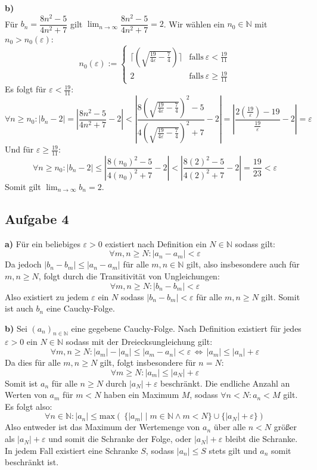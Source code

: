 \documentclass[a4paper,graphics,11pt]{article}
\newcommand{\aufgabe}[1]{\subsection*{Aufgabe #1}}
\begin{document}
\textbf{b)}\\
Für $b_n=\dfrac{8n^2-5}{4n^2+7}$ gilt $\lim_{n \to\infty}\limits \dfrac{8n^2-5}{4n^2+7}=2$.
Wir wählen ein $n_0 \in \mathbb{N}$ mit $n_0 > n_0(\varepsilon)$:
$$
    n_0(\varepsilon) := \begin{cases}
        \Big\lceil\left(\sqrt{\frac{19}{4\varepsilon} - \frac{7}{4}}\right)\Big\rceil
            & \text{falls}\ \varepsilon < \frac{19}{11}\\
        2
            & \text{falls}\ \varepsilon \geq \frac{19}{11}
    \end{cases}
$$
Es folgt für $\varepsilon < \frac{19}{11}\colon$
$$
    \forall n \geq n_0\colon \vert b_n -2\vert = \left|\frac{8n^2-5}{4n^2+7}-2\right| <
    \left|\frac{8\left(\sqrt{\frac{19}{4\varepsilon}-\frac{7}{4}} \right)^2-5}{4\left(\sqrt{\frac{19}{4\varepsilon} - \frac{7}{4}} \right)^2+7} -2\right|
    =\left|\frac{2(\frac{19}{\varepsilon})-19}{\frac{19}{\varepsilon}} -2\right| = \varepsilon
$$
Und für $\varepsilon \geq \frac{19}{11}\colon$
$$
    \forall n\geq n_0 \colon \vert b_n -2\vert \leq \left|\frac{8(n_0)^2-5}{4(n_0)^2+7}-2\right|
    < \left|\frac{8(2)^2-5}{4(2)^2+7}-2\right| = \frac{19}{23} < \varepsilon
$$
Somit gilt $\lim_{n \to \infty}\limits b_n = 2$.
\newpage
\aufgabe{4}
\textbf{a)}
Für ein beliebiges $\varepsilon > 0$ existiert nach Definition ein $N \in \mathbb{N}$ sodass
gilt:
$$
    \forall m,n \geq N\colon |a_n-a_m| < \varepsilon
$$
Da jedoch $|b_n - b_m| \leq |a_n-a_m|$ für alle $m,n \in \mathbb{N}$ gilt, also insbesondere
auch für $m,n \geq N$, folgt durch die Transitivität von Ungleichungen:
$$
    \forall m,n \geq N\colon |b_n-b_m| < \varepsilon
$$
Also existiert zu jedem $\varepsilon$ ein $N$ sodass $|b_n-b_m| < \varepsilon$ für alle
$m,n \geq N$ gilt. Somit ist auch $b_n$ eine Cauchy-Folge.


\textbf{b)}
Sei $(a_n)_{n \in \mathbb{N}}$ eine gegebene Cauchy-Folge. Nach Definition existiert
für jedes $\varepsilon >0$ ein $N \in \mathbb{N}$ sodass mit der Dreiecksungleichung gilt:
$$
    \forall m,n \geq N \colon |a_m|-|a_n|\leq|a_m-a_n| < \varepsilon 
    \,\Longleftrightarrow\, |a_m| \leq |a_n| + \varepsilon
$$
Da dies für alle $m,n \geq N$ gilt, folgt insbesondere für $n=N$:
$$
    \forall m \geq N \colon |a_m| \leq |a_N|+\varepsilon
$$
Somit ist $a_n$ für alle $n \geq N$ durch $|a_N|+\varepsilon$ beschränkt.
Die endliche Anzahl an Werten von $a_m$ für $m<N$ haben ein Maximum $M$, sodass $\forall n <N\colon a_n < M$ gilt. Es folgt also:
$$
    \forall n \in \mathbb{N} \colon |a_n| \leq \text{max}(\ \{|a_m|\mid m\in \mathbb{N} \land m < N\}
    \cup \{|a_N|+\varepsilon\})
$$
Also entweder ist das Maximum der Wertemenge von $a_n$ über alle $n<N$ größer als
$|a_N|+\varepsilon$ und somit die Schranke der Folge, oder $|a_N|+\varepsilon$
bleibt die Schranke. In jedem Fall existiert eine Schranke $S$, sodass
$|a_n| \leq S$ stets gilt und $a_n$ somit beschränkt ist.
\end{document}
